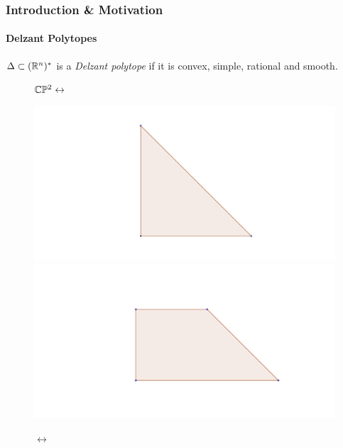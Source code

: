 \begin{frame}
\frametitle{Introduction \& Motivation}
\framesubtitle{Delzant Polytopes}

\begin{defn}
	$\Delta \subset (\mathbb{R}^{n})^{\ast}$ is a \emph{Delzant polytope} if it is convex, simple, rational and smooth.
\end{defn}

\begin{exs}
	\begin{figure}
		\centering
		$\mathbb{C}\mathbb{P}^{2}\leftrightarrow$\hspace{-24pt}
		\begin{minipage}{.3\textwidth}
			\centering
			\includegraphics[width=.4\linewidth]{figures/cp2-polytope}
		\end{minipage}%
		\begin{minipage}{.3\textwidth}
			\centering
			\includegraphics[height=.4\linewidth]{figures/blowup-polytope}
		\end{minipage}
		\hspace{-12pt}$\leftrightarrow$\ 
	\end{figure}
\end{exs}

\end{frame}

